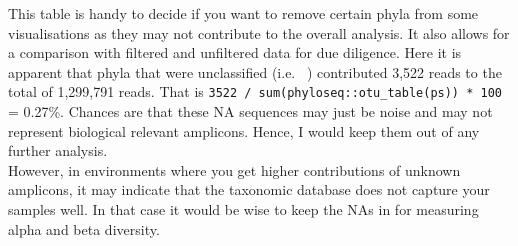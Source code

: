 \documentclass[
]{book}
\newenvironment{Shaded}{\begin{snugshade}}{\end{snugshade}}
\newcommand{\AttributeTok}[1]{\textcolor[rgb]{0.77,0.63,0.00}{#1}}
\newcommand{\CommentTok}[1]{\textcolor[rgb]{0.56,0.35,0.01}{\textit{#1}}}
\newcommand{\ControlFlowTok}[1]{\textcolor[rgb]{0.13,0.29,0.53}{\textbf{#1}}}
\newcommand{\DecValTok}[1]{\textcolor[rgb]{0.00,0.00,0.81}{#1}}
\newcommand{\DocumentationTok}[1]{\textcolor[rgb]{0.56,0.35,0.01}{\textbf{\textit{#1}}}}
\newcommand{\FunctionTok}[1]{\textcolor[rgb]{0.00,0.00,0.00}{#1}}
\newcommand{\NormalTok}[1]{#1}
\newcommand{\OtherTok}[1]{\textcolor[rgb]{0.56,0.35,0.01}{#1}}
\newcommand{\SpecialCharTok}[1]{\textcolor[rgb]{0.00,0.00,0.00}{#1}}
\newcommand{\StringTok}[1]{\textcolor[rgb]{0.31,0.60,0.02}{#1}}
\begin{document}
This table is handy to decide if you want to remove certain phyla from some visualisations as they may not contribute to the overall analysis. It also allows for a comparison with filtered and unfiltered data for due diligence. Here it is apparent that phyla that were unclassified (i.e.~ ) contributed 3,522 reads to the total of 1,299,791 reads. That is \texttt{3522\ /\ sum(phyloseq::otu\_table(ps))\ *\ 100} = 0.27\%. Chances are that these NA sequences may just be noise and may not represent biological relevant amplicons. Hence, I would keep them out of any further analysis.\\
However, in environments where you get higher contributions of unknown amplicons, it may indicate that the taxonomic database does not capture your samples well. In that case it would be wise to keep the NAs in for measuring alpha and beta diversity.

\begin{Shaded}
\end{Shaded}
\end{document}
